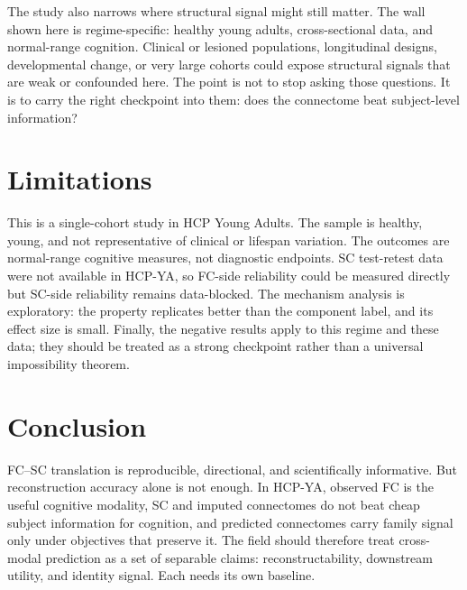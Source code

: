 \documentclass{article}
\begin{document}
The study also narrows where structural signal might still matter. The wall shown here is regime-specific: healthy young adults, cross-sectional data, and normal-range cognition. Clinical or lesioned populations, longitudinal designs, developmental change, or very large cohorts could expose structural signals that are weak or confounded here. The point is not to stop asking those questions. It is to carry the right checkpoint into them: does the connectome beat subject-level information?

\section{Limitations}

This is a single-cohort study in HCP Young Adults. The sample is healthy, young, and not representative of clinical or lifespan variation. The outcomes are normal-range cognitive measures, not diagnostic endpoints. SC test-retest data were not available in HCP-YA, so FC-side reliability could be measured directly but SC-side reliability remains data-blocked. The mechanism analysis is exploratory: the property replicates better than the component label, and its effect size is small. Finally, the negative results apply to this regime and these data; they should be treated as a strong checkpoint rather than a universal impossibility theorem.

\section{Conclusion}

FC--SC translation is reproducible, directional, and scientifically informative. But reconstruction accuracy alone is not enough. In HCP-YA, observed FC is the useful cognitive modality, SC and imputed connectomes do not beat cheap subject information for cognition, and predicted connectomes carry family signal only under objectives that preserve it. The field should therefore treat cross-modal prediction as a set of separable claims: reconstructability, downstream utility, and identity signal. Each needs its own baseline.
\end{document}

